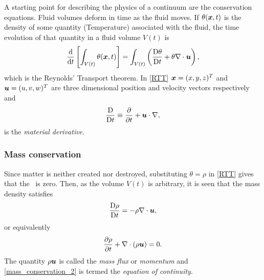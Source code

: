 
A starting point for describing the physics of a continuum are the conservation equations. Fluid volumes deform in time as the fluid moves. If $\theta({\mbox{\boldmath$x$}},t)$ is the density of some quantity (\eg Temperature) associated with the fluid, the time evolution of that quantity in a fluid volume $V(t)$ is 
\begin{equation}\label{RTT}
 \frac{\mathrm{d}}{\mathrm{d} t}\left[\int_{V(t)}\theta({\mbox{\boldmath$x$}},t)\right]=
 \int_{V(t)}\left(\frac{\mathrm{D}\theta}{\mathrm{D} t}+\theta\nabla\cdot{\mbox{\boldmath$u$}}\right),
\end{equation}
which is the Reynolds' Transport theorem. In \eqref{RTT} ${\mbox{\boldmath$x$}}=(x,y,z)^T$ and ${\mbox{\boldmath$u$}}=(u,v,w)^T$ are three dimensional position and velocity vectors respectively and 
\begin{equation}\label{MatDiv}
 \frac{\mathrm{D}}{\mathrm{D} t}\equiv\frac{\partial}{\partial{t}}+{\mbox{\boldmath$u$}}\cdot\nabla,
\end{equation}
is the \textit{material derivative}.

\subsubsection{Mass conservation}
Since matter is neither created nor destroyed, substituting $\theta=\rho$ in \eqref{RTT} gives that the \lhs\ is zero. Then, as the volume $V(t)$ is arbitrary, it is seen that the mass density satisfies
\begin{equation}\label{mass_conservation}
 \frac{\mathrm{D}\rho}{\mathrm{D} t}=-\rho\nabla\cdot{\mbox{\boldmath$u$}},
\end{equation}
or equivalently
\begin{equation}\label{mass_conservation_2}
 \frac{\partial\rho}{\partial{t}}+\nabla\cdot(\rho{\mbox{\boldmath$u$}})=0.
\end{equation}
The quantity $\rho{\mbox{\boldmath$u$}}$ is called the \textit{mass flux} or \textit{momentum} and \eqref{mass_conservation_2} is termed the \textit{equation of continuity}.


